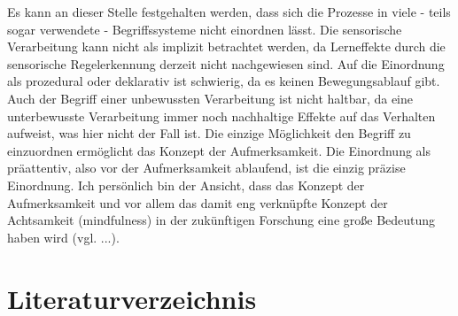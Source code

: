\documentclass[doc,a4paper,12pt]{apa6}
\begin{document}
Es kann an dieser Stelle festgehalten werden, dass sich die Prozesse in viele - teils sogar verwendete - Begriffssysteme nicht einordnen lässt. Die sensorische Verarbeitung kann nicht als implizit betrachtet werden, da Lerneffekte durch die sensorische Regelerkennung derzeit nicht nachgewiesen sind. Auf die Einordnung als prozedural oder deklarativ ist schwierig, da es keinen Bewegungsablauf gibt. Auch der Begriff einer unbewussten Verarbeitung ist nicht haltbar, da eine unterbewusste Verarbeitung immer noch nachhaltige Effekte auf das Verhalten aufweist, was hier nicht der Fall ist. Die einzige Möglichkeit den Begriff zu einzuordnen ermöglicht das Konzept der Aufmerksamkeit. Die Einordnung als präattentiv, also vor der Aufmerksamkeit ablaufend, ist die einzig präzise Einordnung. Ich persönlich bin der Ansicht, dass das Konzept der Aufmerksamkeit und vor allem das damit eng verknüpfte Konzept der Achtsamkeit (mindfulness) in der zukünftigen Forschung eine große Bedeutung haben wird (vgl. ...).



\section{Literaturverzeichnis}

\printbibliography[heading=none]
\end{document}
